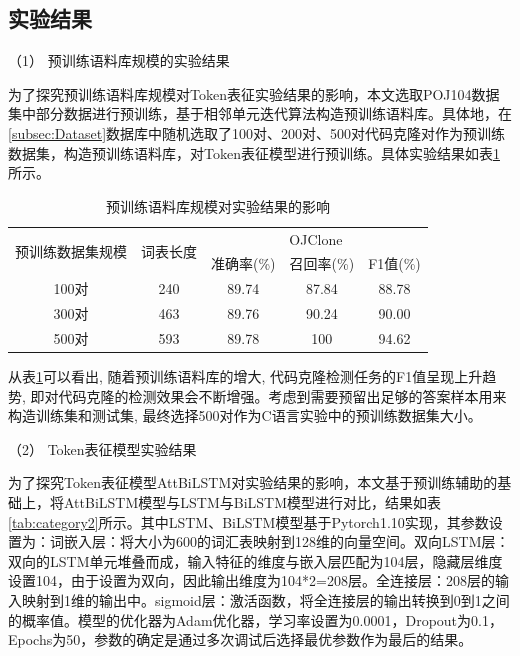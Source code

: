 \subsection{实验结果}
\label{subsec:TokenResult}
（1） 预训练语料库规模的实验结果

为了探究预训练语料库规模对Token表征实验结果的影响，本文选取POJ104数据集中部分数据进行预训练，基于相邻单元迭代算法构造预训练语料库。具体地，在\ref{subsec:Dataset}数据库中随机选取了100对、200对、500对代码克隆对作为预训练数据集，构造预训练语料库，对Token表征模型进行预训练。具体实验结果如表\ref{tab:category}所示。

\begin{table}[H]  
  \centering  
  \caption{预训练语料库规模对实验结果的影响}   
  \label{tab:category}  
  \begin{tabular*}{0.9\textwidth}{@{\extracolsep{\fill}}ccccc}  
  \toprule
  \multirow{2}{*}{预训练数据集规模} & \multirow{2}{*}{词表长度} & \multicolumn{3}{c}{OJClone} \\
  \cmidrule{3-5} 
   & & 准确率(\%) & 召回率(\%) & F1值(\%)  \\  
  \midrule 
  100对	&240		& 89.74	& 87.84	& 88.78		 \\  
  300对	&463		& 89.76	& 90.24	& 90.00	 \\  
  500对	&593 	  & 89.78	& 100	& 94.62	   \\  
  \bottomrule  
  \end{tabular*}  
\end{table}
从表\ref{tab:category}可以看出, 随着预训练语料库的增大, 代码克隆检测任务的F1值呈现上升趋势, 即对代码克隆的检测效果会不断增强。考虑到需要预留出足够的答案样本用来构造训练集和测试集, 最终选择500对作为C语言实验中的预训练数据集大小。

（2） Token表征模型实验结果

为了探究Token表征模型AttBiLSTM对实验结果的影响，本文基于预训练辅助的基础上，将AttBiLSTM模型与LSTM与BiLSTM模型进行对比，结果如表\ref{tab:category2}所示。其中LSTM、BiLSTM模型基于Pytorch1.10实现，其参数设置为：词嵌入层：将大小为600的词汇表映射到128维的向量空间。双向LSTM层：双向的LSTM单元堆叠而成，输入特征的维度与嵌入层匹配为104层，隐藏层维度设置104，由于设置为双向，因此输出维度为104*2=208层。全连接层：208层的输入映射到1维的输出中。sigmoid层：激活函数，将全连接层的输出转换到0到1之间的概率值。模型的优化器为Adam优化器，学习率设置为0.0001，Dropout为0.1，Epochs为50，参数的确定是通过多次调试后选择最优参数作为最后的结果。

